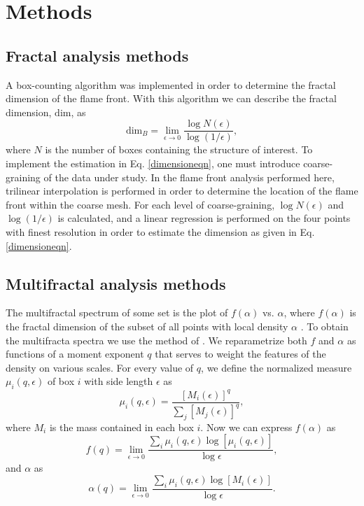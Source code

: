 \documentclass[iop]{emulateapj}
\begin{document}
\section{Methods}\label{Methods}

\subsection{Fractal analysis methods}\label{FractalMethods}
A box-counting algorithm \citep[see][for example]{Falconer2003} was implemented in order to determine the fractal dimension of the flame front. With this algorithm we can describe the fractal dimension, $\mathrm{dim}$, as
\begin{equation}\label{dimensioneqn}
	\mathrm{dim}_B = \lim_{\epsilon \to 0} \frac{\log N(\epsilon)}{\log (1 / \epsilon)},
\end{equation}
where $N$ is the number of boxes containing the structure of interest.  To implement the estimation in Eq. \ref{dimensioneqn}, one must introduce coarse-graining of the data under study. In the flame front analysis performed here, trilinear interpolation is performed in order to determine the location of the flame front within the coarse mesh. For each level of coarse-graining, $\log{N(\epsilon)}$ and $\log{(1/\epsilon)}$ is calculated, and a linear regression is performed on the four points with finest resolution in order to estimate the dimension as given in Eq. \ref{dimensioneqn}.

\subsection{Multifractal analysis methods}\label{MultifractalMethods}
The multifractal spectrum of some set is the plot of $f(\alpha)$ vs. $\alpha$, where $f(\alpha)$ is the fractal dimension of the subset of all points with local density $\alpha$ \citep[see][for example]{Falconer2003}. To obtain the multifracta spectra we use the method of \cite{Chhabra1989}. We reparametrize both $f$ and $\alpha$ as functions of a moment exponent $q$ that serves to weight the features of the density on various scales. For every value of $q$, we define the normalized measure $\mu_i(q, \epsilon)$ of box $i$ with side length $\epsilon$ as
\begin{equation} 
	\mu_i(q, \epsilon) = \frac{[M_i(\epsilon)]^q}{\sum_j[M_j(\epsilon)]^q},
\end{equation}
where $M_i$ is the mass contained in each box $i$. Now we can express $f(\alpha)$ as
\begin{equation}
	f(q) = \lim_{\epsilon \to 0} \frac{\sum_i \mu_i(q, \epsilon) \log[\mu_i(q, \epsilon)]}{\log \epsilon},
\end{equation}
and $\alpha$ as
\begin{equation}
	\alpha (q) = \lim_{\epsilon \to 0} \frac{\sum_i \mu_i(q, \epsilon) \log[M_i(\epsilon)]}{\log \epsilon}.
\end{equation}
\end{document}
